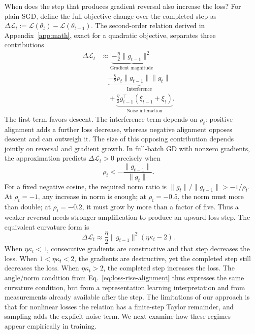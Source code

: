 When does the step that produces gradient reversal also increase the loss? For plain SGD, define the full-objective change over the completed step as $\Delta\mathcal L_t:=\mathcal L(\theta_t)-\mathcal L(\theta_{t-1})$. The second-order relation derived in Appendix~\ref{app:math}, exact for a quadratic objective, separates three contributions
\begin{equation}
\begin{aligned}
\Delta\mathcal L_t
&\approx\underbrace{-\frac{\eta}{2}\|g_{t-1}\|^2}_{\text{Gradient magnitude}}\\
&\quad\underbrace{-\frac{\eta}{2}\rho_t\|g_{t-1}\|\|g_t\|}_{\text{Interference}}\\
&\quad+\underbrace{\frac{\eta}{2}g_{t-1}^\top(\xi_{t-1}+\xi_t)}_{\text{Noise interaction}}.
\end{aligned}
\label{eq:loss-curvature}
\end{equation}
The first term favors descent. The interference term depends on $\rho_t$: positive alignment adds a further loss decrease, whereas negative alignment opposes descent and can outweigh it. The size of this opposing contribution depends jointly on reversal and gradient growth. In full-batch GD with nonzero gradients, the approximation predicts $\Delta\mathcal L_t>0$ precisely when
\begin{equation}
  \boxed{\rho_t<-\frac{\|g_{t-1}\|}{\|g_t\|}.}
  \label{eq:loss-rise-alignment}
\end{equation}
For a fixed negative cosine, the required norm ratio is $\|g_t\|/\|g_{t-1}\|>-1/\rho_t$. At $\rho_t=-1$, any increase in norm is enough; at $\rho_t=-0.5$, the norm must more than double; at $\rho_t=-0.2$, it must grow by more than a factor of five. Thus a weaker reversal needs stronger amplification to produce an upward loss step. The equivalent curvature form is
\begin{equation}
  \Delta\mathcal L_t\approx
  \frac{\eta}{2}\|g_{t-1}\|^2(\eta\kappa_t-2).
  \label{eq:loss-rise-curvature}
\end{equation}
When $\eta\kappa_t<1$, consecutive gradients are constructive and that step decreases the loss. When $1<\eta\kappa_t<2$, the gradients are destructive, yet the completed step still decreases the loss. When $\eta\kappa_t>2$, the completed step increases the loss. The angle/norm condition from Eq.~\ref{eq:loss-rise-alignment} thus expresses the same curvature condition, but from a representation learning interpretation and from measurements already available after the step. The limitations of our approach is that for nonlinear losses the relation has a finite-step Taylor remainder, and sampling adds the explicit noise term. We next examine how these regimes appear empirically in training.